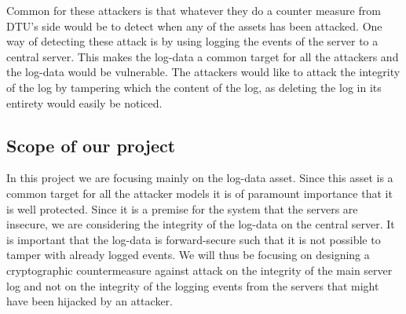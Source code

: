 Common for these attackers is that whatever they do a counter measure from DTU's side would be to detect when any of the assets has been attacked. One way of detecting these attack is by using logging the events of the server to a central server. This makes the log-data a common target for all the attackers and the log-data would be vulnerable. The attackers would like to attack the integrity of the log by tampering which the content of the log, as deleting the log in its entirety would easily be noticed.

\subsection{Scope of our project}
In this project we are focusing mainly on the log-data asset. Since this asset is a common target for all the attacker models it is of paramount importance that it is well protected. Since it is a premise for the system that the servers are insecure, we are considering the integrity of the log-data on the central server. It is important that the log-data is forward-secure such that it is not possible to tamper with already logged events. We will thus be focusing on designing a cryptographic countermeasure against attack on the integrity of the main server log and not on the integrity of the logging events from the servers that might have been hijacked by an attacker.




